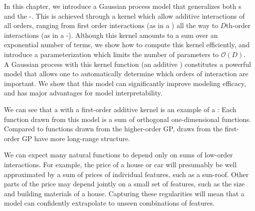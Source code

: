 In this chapter, we introduce a Gaussian process model that generalizes both \GAM{}s and the \SE-\gp{}.
This is achieved through a kernel which allow additive interactions of all orders, ranging from first order interactions (as in a \GAM{}) all the way to $D$th-order interactions (as in a \SE-\gp{}).
Although this kernel amounts to a sum over an exponential number of terms, we show how to compute this kernel efficiently, and introduce a parameterization which limits the number of parameters to $\mathcal{O}(D)$.
A Gaussian process with this kernel function (an additive \gp{}) constitutes a powerful model that allows one to automatically determine which orders of interaction are important.
We show that this model can significantly improve modeling efficacy, and has major advantages for model interpretability.



We can see that a \gp{} with a first-order additive kernel is an example of a \GAM{}:  Each function drawn from this model is a sum of orthogonal one-dimensional functions.
Compared to functions drawn from the higher-order GP, draws from the first-order GP have more long-range structure.



We can expect many natural functions to depend only on sums of low-order interactions.
For example, the price of a house or car will presumably be well approximated by a sum of prices of individual features, such as a sun-roof.  
Other parts of the price may depend jointly on a small set of features, such as the size and building materials of a house.
Capturing these regularities will mean that a model can confidently extrapolate to unseen combinations of features.



